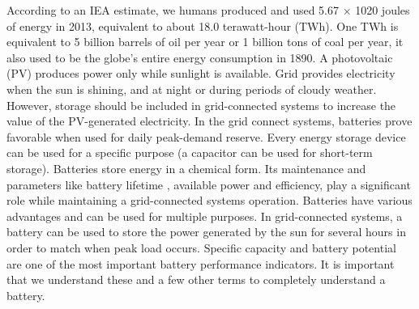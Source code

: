 According to an IEA estimate, we humans produced and used 5.67 × 1020 joules of energy in 2013, equivalent to about 18.0 terawatt-hour (TWh). One TWh is equivalent to 5 billion barrels of oil per year or 1 billion tons of coal per year, it also used to be the globe's entire energy consumption in 1890.
A photovoltaic (PV) produces power only while sunlight is available. Grid provides electricity when the sun is shining, and at night or during periods of cloudy weather. However, storage should be included in grid-connected systems to increase the value of the PV-generated electricity. In the grid connect systems, batteries prove favorable when used for daily peak-demand reserve. 
Every energy storage device can be used for a specific purpose (a capacitor can be used for short-term storage). Batteries store energy in a chemical form. Its maintenance and parameters like battery lifetime , available power and efficiency, play a significant role while maintaining a grid-connected systems operation. Batteries have various advantages and can be used for multiple purposes. In grid-connected systems, a battery can be used to store the power generated by the sun for several hours in order to match when peak load occurs. Specific capacity and battery potential are one of the most important battery performance indicators. It is important that we understand these and a few other terms to completely understand a battery. 
